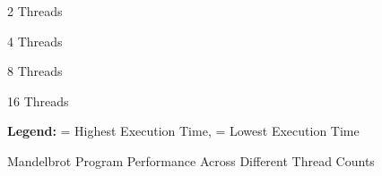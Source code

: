 \documentclass[
	report, %
	11pt, %
]{CSUniSchoolLabReport}
\begin{document}
\begin{table}[H]
	\begin{adjustwidth}{-4cm}{-4cm} %
		\centering
		\begin{subtable}[t]{0.65\textwidth}
			\centering
			\caption{2 Threads}
			\label{tab:threads_2}

			\begin{adjustbox}{width=\textwidth}
				
			\end{adjustbox}
		\end{subtable}
		\begin{subtable}[t]{0.64\textwidth}
			\centering
			\caption{4 Threads}
			\label{tab:threads_4}

			\begin{adjustbox}{width=\textwidth}
				
			\end{adjustbox}
		\end{subtable}

		\vspace{0.2cm} %

		\begin{subtable}[t]{0.65\textwidth}
			\centering
			\caption{8 Threads}
			\label{tab:threads_8}

			\begin{adjustbox}{width=\textwidth}
				
			\end{adjustbox}
		\end{subtable}
		\begin{subtable}[t]{0.64\textwidth}
			\centering
			\caption{16 Threads}
			\label{tab:threads_16}

			\begin{adjustbox}{width=\textwidth}
				
			\end{adjustbox}
		\end{subtable}

		\vspace{0.2cm}
		\noindent \textbf{Legend:}  = Highest Execution Time,  = Lowest Execution Time
		\captionsetup{justification=centering, width=.8\linewidth}
		\caption{Mandelbrot Program Performance Across Different Thread Counts}
		\label{tab:performance_tables}
	\end{adjustwidth}
\end{table}
\end{document}
